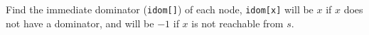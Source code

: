 Find the immediate dominator (\texttt{idom[]}) of each node, \texttt{idom[x]} will be $x$ if $x$ does not have a dominator, and will be $-1$ if $x$ is not reachable from $s$. 


